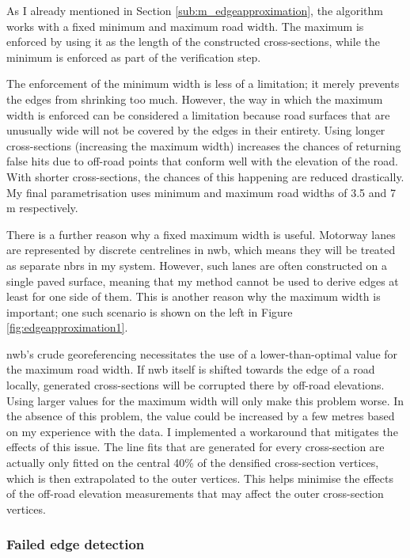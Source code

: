 As I already mentioned in Section \ref{sub:m_edgeapproximation}, the algorithm works with a fixed minimum and maximum road width. The maximum is enforced by using it as the length of the constructed cross-sections, while the minimum is enforced as part of the verification step.

The enforcement of the minimum width is less of a limitation; it merely prevents the edges from shrinking too much. However, the way in which the maximum width is enforced can be considered a limitation because road surfaces that are unusually wide will not be covered by the edges in their entirety. Using longer cross-sections (increasing the maximum width) increases the chances of returning false hits due to off-road points that conform well with the elevation of the road. With shorter cross-sections, the chances of this happening are reduced drastically. My final parametrisation uses minimum and maximum road widths of 3.5 and 7 m respectively.

There is a further reason why a fixed maximum width is useful. Motorway lanes are represented by discrete centrelines in \ac{nwb}, which means they will be treated as separate \ac{nbrs} in my system. However, such lanes are often constructed on a single paved surface, meaning that my method cannot be used to derive edges at least for one side of them. This is another reason why the maximum width is important; one such scenario is shown on the left in Figure \ref{fig:edgeapproximation1}.

\ac{nwb}'s crude georeferencing necessitates the use of a lower-than-optimal value for the maximum road width. If \ac{nwb} itself is shifted towards the edge of a road locally, generated cross-sections will be corrupted there by off-road elevations. Using larger values for the maximum width will only make this problem worse. In the absence of this problem, the value could be increased by a few metres based on my experience with the data. I implemented a workaround that mitigates the effects of this issue. The line fits that are generated for every cross-section are actually only fitted on the central 40\% of the densified cross-section vertices, which is then extrapolated to the outer vertices. This helps minimise the effects of the off-road elevation measurements that may affect the outer cross-section vertices. 

\subsubsection{Failed edge detection}

